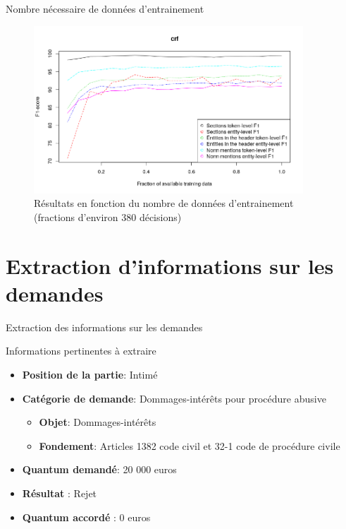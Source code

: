 \documentclass[newPxFont,pagenumber]{beamer}
\begin{document}
\begin{frame}{Nombre nécessaire de données d'entrainement}
\begin{figure}[!h]
\includegraphics[width=0.9\textwidth]{lc-crf.png}
\caption{Résultats en fonction du nombre de données d'entrainement (fractions d'environ 380 décisions)}\label{p4_crf-learning-curves}
\end{figure}
\end{frame}

\section{Extraction d'informations sur les demandes}

\begin{frame}{Extraction des informations sur les demandes}
\begin{block}{Informations pertinentes à extraire}
\begin{itemize}
\item \textbf{Position de la partie}: Intimé
\item \textbf{Catégorie de demande}: Dommages-intérêts pour procédure abusive
\begin{itemize}
\item \textbf{Objet}: Dommages-intérêts
\item \textbf{Fondement}: Articles 1382 code civil et 32-1 code de procédure civile
\end{itemize}
\item \textbf{Quantum demandé}: 20 000 euros
\item \textbf{Résultat} : Rejet
\item \textbf{Quantum accordé} : 0 euros
\end{itemize}
\end{block}
\end{frame}
\end{document}
